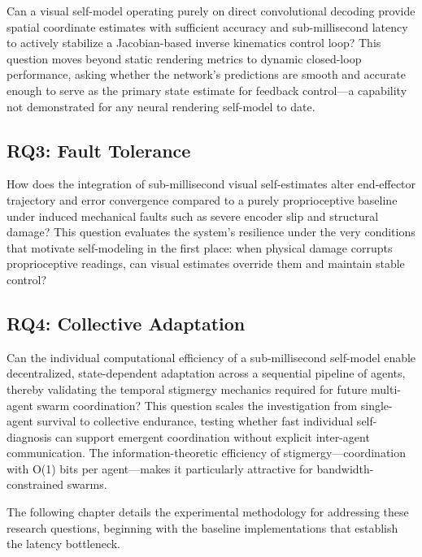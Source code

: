 \documentclass[12pt,a4paper,oneside]{report}
\begin{document}
Can a visual self-model operating purely on direct convolutional decoding provide spatial coordinate estimates with sufficient accuracy and sub-millisecond latency to actively stabilize a Jacobian-based inverse kinematics control loop? This question moves beyond static rendering metrics to dynamic closed-loop performance, asking whether the network's predictions are smooth and accurate enough to serve as the primary state estimate for feedback control---a capability not demonstrated for any neural rendering self-model to date.

\subsection{RQ3: Fault Tolerance}

How does the integration of sub-millisecond visual self-estimates alter end-effector trajectory and error convergence compared to a purely proprioceptive baseline under induced mechanical faults such as severe encoder slip and structural damage? This question evaluates the system's resilience under the very conditions that motivate self-modeling in the first place: when physical damage corrupts proprioceptive readings, can visual estimates override them and maintain stable control?

\subsection{RQ4: Collective Adaptation}

Can the individual computational efficiency of a sub-millisecond self-model enable decentralized, state-dependent adaptation across a sequential pipeline of agents, thereby validating the temporal stigmergy mechanics required for future multi-agent swarm coordination? This question scales the investigation from single-agent survival to collective endurance, testing whether fast individual self-diagnosis can support emergent coordination without explicit inter-agent communication. The information-theoretic efficiency of stigmergy---coordination with O(1) bits per agent---makes it particularly attractive for bandwidth-constrained swarms.

The following chapter details the experimental methodology for addressing these research questions, beginning with the baseline implementations that establish the latency bottleneck.
\clearpage

\end{document}
